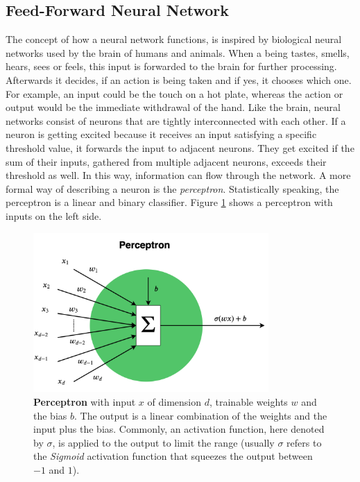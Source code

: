 \documentclass[11pt]{scrartcl}
\begin{document}
\subsection{Feed-Forward Neural Network}

The concept of how a neural network functions, is inspired by biological neural networks used by the brain of humans and animals. When a being tastes, smells, hears, sees or feels, this input is forwarded to the brain for further processing. Afterwards it decides, if an action is being taken and if yes, it chooses which one. For example, an input could be the touch on a hot plate, whereas the action or output would be the immediate withdrawal of the hand. Like the brain, neural networks consist of neurons that are tightly interconnected with each other. If a neuron is getting excited because it receives an input satisfying a specific threshold value, it forwards the input to adjacent neurons. They get excited if the sum of their inputs, gathered from multiple adjacent neurons, exceeds their threshold as well. In this way, information can flow through the network. A more formal way of describing a neuron is the \textit{perceptron}. Statistically speaking, the perceptron is a linear and binary classifier. Figure \ref{fig:perceptron} shows a perceptron with inputs on the left side.

\begin{figure}[hbt]
	\center
	\includegraphics[width=0.8\textwidth]{img/general/perceptron.png}
	\caption{\textcolor{viridis7}{\textbf{Perceptron}} with input $x$ of dimension $d$, trainable weights $w$ and the bias $b$. The output is a linear combination of the weights and the input plus the bias. Commonly, an activation function, here denoted by $\sigma$, is applied to the output to limit the range (usually $\sigma$ refers to the \textit{Sigmoid} activation function that squeezes the output between $-1$ and $1$).}
	\label{fig:perceptron}
\end{figure}
\end{document}
